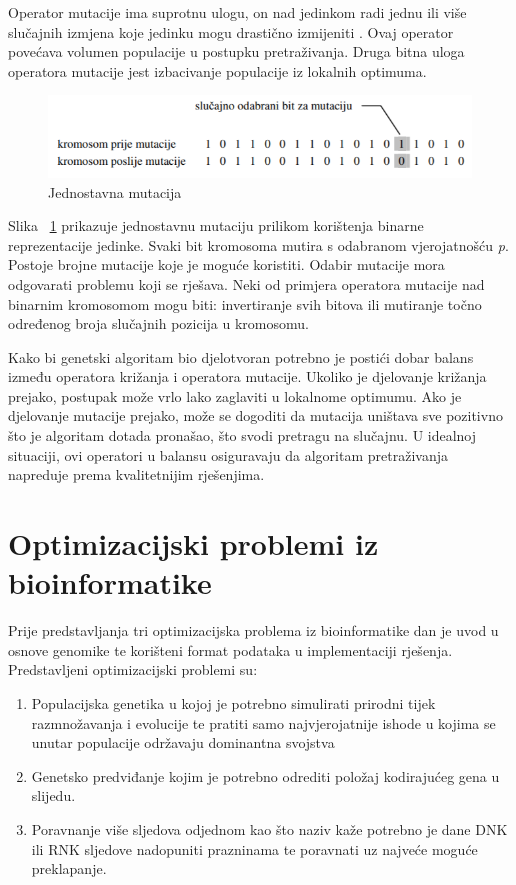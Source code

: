 \documentclass[times, utf8, zavrsni, numeric]{fer}
\begin{document}
Operator mutacije ima suprotnu ulogu, on nad jedinkom radi  jednu ili više slučajnih izmjena koje jedinku mogu drastično izmijeniti . Ovaj operator povećava volumen populacije u postupku pretraživanja. Druga bitna uloga operatora mutacije jest izbacivanje populacije iz lokalnih optimuma.

\begin{figure}[htb]
	\includegraphics[width=\linewidth]{slike/mutacijaPr.PNG}
	\centering
	\caption{Jednostavna mutacija \cite{gaSkripta}}
	\label{fig:mutacija}
\end{figure} 

Slika ~\ref{fig:mutacija} prikazuje jednostavnu mutaciju prilikom korištenja binarne reprezentacije jedinke. Svaki bit kromosoma mutira s odabranom vjerojatnošću \textit{p}. Postoje brojne mutacije koje je moguće koristiti. Odabir mutacije mora odgovarati problemu koji se rješava. Neki od primjera operatora mutacije nad binarnim kromosomom mogu biti: invertiranje svih bitova ili mutiranje točno određenog broja slučajnih pozicija u kromosomu.

Kako bi genetski algoritam bio djelotvoran potrebno je postići dobar balans između operatora križanja i operatora mutacije. Ukoliko je djelovanje križanja prejako, postupak može vrlo lako zaglaviti u lokalnome optimumu. Ako je djelovanje mutacije prejako, može se dogoditi da mutacija uništava sve pozitivno što je algoritam dotada pronašao, što svodi pretragu na slučajnu. U idealnoj situaciji, ovi operatori u balansu osiguravaju da algoritam pretraživanja napreduje prema kvalitetnijim rješenjima.


\chapter{Optimizacijski problemi iz bioinformatike} \label{bioinformatika}

Prije predstavljanja tri optimizacijska problema iz bioinformatike dan je uvod u osnove genomike te korišteni format podataka u implementaciji rješenja. Predstavljeni optimizacijski problemi su:
\begin{enumerate}
	\item Populacijska genetika u kojoj je potrebno simulirati prirodni tijek razmnožavanja i evolucije te pratiti samo najvjerojatnije ishode u kojima se unutar populacije održavaju dominantna svojstva
	\item Genetsko predviđanje kojim je potrebno odrediti položaj kodirajućeg gena u slijedu.
	\item Poravnanje više sljedova odjednom kao što naziv kaže potrebno je dane DNK ili RNK sljedove nadopuniti prazninama te poravnati uz najveće moguće preklapanje.
\end{enumerate}
\end{document}
